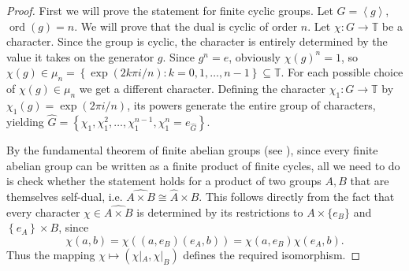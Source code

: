 \begin{proof}
    First we will prove the statement for finite cyclic groups. Let \( G =
    \left\langle g \right\rangle \), \( \operatorname{ord}(g) = n \). We will
    prove that the dual is cyclic of order \( n \). Let \( \chi\colon
    G \rightarrow \mathbb{T} \) be a character. Since the group is
    cyclic, the character is
    entirely determined by the value it takes on the generator \( g \). Since
    \( g^{n} = e \), obviously \( \chi(g)^{n} = 1 \), so \( \chi(g)
        \in \mu_{n} = \left\{ \exp\left( 2k \pi i / n \right) \colon k =
    0, 1, \dots, n-1 \right\} \subseteq \mathbb{T} \). For each
    possible choice of \(
    \chi(g) \in \mu_{n} \) we get a
    different character. Defining the character \( \chi_1 \colon G \rightarrow
    \mathbb{T} \) by \( \chi_1(g) = \exp\left( 2 \pi i / n \right)
    \), its powers generate the entire group of characters, yielding
    \( \widehat{G} = \left\{ \chi_1, \chi_1^{2},
    \dots, \chi_1^{n-1}, \chi_1^{n} = e_{\widehat{G}} \right\} \).

    By the fundamental theorem of finite abelian
    groups (see \textcite[Section 5.2]{dummit04}), since every
    finite abelian group can be written as a finite product
    of finite cycles, all we need to do is check whether the statement
    holds for a product of two groups \( A, B \) that are themselves
    self-dual, i.e. \( \widehat{A \times B} \cong \widehat{A} \times
    \widehat{B} \). This follows directly from the fact that every character
    \( \chi \in \widehat{A \times B} \) is determined by its restrictions
    to \( A \times \{e_{B}\} \) and \( \left\{ e_{A} \right\} \times B \), since
    \[
        \chi(a, b) = \chi((a, e_{B})(e_{A}, b)) = \chi(a, e_{B})\chi(e_{A}, b).
    \]
    Thus the mapping \( \chi \mapsto (\chi|_{A}, \chi|_{B})
    \) defines the required isomorphism.
\end{proof}

